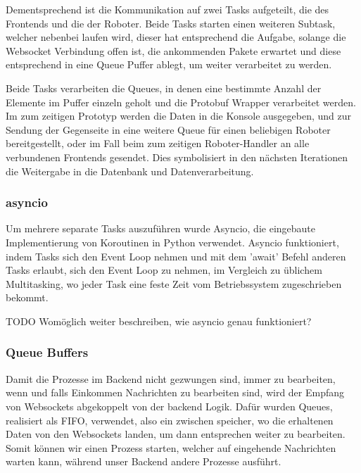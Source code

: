 Dementsprechend ist die Kommunikation auf zwei Tasks aufgeteilt,
die des Frontends und die der Roboter.
Beide Tasks starten einen weiteren Subtask, welcher nebenbei laufen wird, 
dieser hat entsprechend die Aufgabe, solange die Websocket Verbindung offen ist,
die ankommenden Pakete erwartet und diese entsprechend in eine Queue Puffer ablegt, 
um weiter verarbeitet zu werden. 

Beide Tasks verarbeiten die Queues, 
in denen eine bestimmte Anzahl der Elemente im Puffer 
einzeln geholt und die Protobuf Wrapper verarbeitet werden.
% 
Im zum zeitigen Prototyp werden die Daten in die Konsole ausgegeben,
und zur Sendung der Gegenseite in eine weitere Queue 
für einen beliebigen Roboter bereitgestellt, 
oder im Fall beim zum zeitigen Roboter-Handler 
an alle verbundenen Frontends gesendet.
% 
Dies symbolisiert in den nächsten Iterationen die Weitergabe 
in die Datenbank und Datenverarbeitung.


\subsubsection{asyncio}
Um mehrere separate Tasks auszuführen wurde Asyncio,
die eingebaute Implementierung von Koroutinen in Python verwendet.
% 
Asyncio funktioniert, indem Tasks sich den Event Loop nehmen und mit dem 'await' 
Befehl anderen Tasks erlaubt, sich den Event Loop zu nehmen, 
im Vergleich zu üblichem Multitasking,
wo jeder Task eine feste Zeit vom Betriebssystem zugeschrieben bekommt.

TODO Womöglich weiter beschreiben, wie asyncio genau funktioniert?

\subsubsection{Queue Buffers}
Damit die Prozesse im Backend nicht gezwungen sind, immer zu bearbeiten, 
wenn und falls Einkommen Nachrichten zu bearbeiten sind, 
wird der Empfang von Websockets abgekoppelt von der backend Logik.
Dafür wurden Queues, realisiert als FIFO, verwendet, also ein zwischen speicher, 
wo die erhaltenen Daten von den Websockets landen, 
um dann entsprechen weiter zu bearbeiten.
% 
Somit können wir einen Prozess starten, 
welcher auf eingehende Nachrichten warten kann,
während unser Backend andere Prozesse ausführt.

